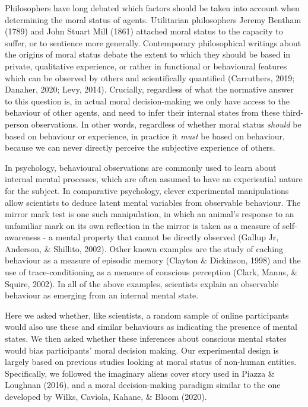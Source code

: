\documentclass[10pt, letterpaper]{article}
\begin{document}
Philosophers have long debated which factors should be taken into
account when determining the moral status of agents. Utilitarian
philosophers Jeremy Bentham (1789) and John Stuart Mill (1861) attached
moral status to the capacity to suffer, or to sentience more generally.
Contemporary philosophical writings about the origins of moral status
debate the extent to which they should be based in private, qualitative
experience, or rather in functional or behavioural features which can be
observed by others and scientifically quantified (Carruthers, 2019;
Danaher, 2020; Levy, 2014). Crucially, regardless of what the normative
answer to this question is, in actual moral decision-making we only have
access to the behaviour of other agents, and need to infer their
internal states from these third-person observations. In other words,
regardless of whether moral status \emph{should} be based on behaviour
or experience, in practice it \emph{must} be based on behaviour, because
we can never directly perceive the subjective experience of others.

In psychology, behavioural observations are commonly used to learn about
internal mental processes, which are often assumed to have an
experiential nature for the subject. In comparative psychology, clever
experimental manipulations allow scientists to deduce latent mental
variables from observable behaviour. The mirror mark test is one such
manipulation, in which an animal's response to an unfamiliar mark on its
own reflection in the mirror is taken as a measure of self-awareness - a
mental property that cannot be directly observed (Gallup Jr, Anderson,
\& Shillito, 2002). Other known examples are the study of caching
behaviour as a measure of episodic memory (Clayton \& Dickinson, 1998)
and the use of trace-conditioning as a measure of conscious perception
(Clark, Manns, \& Squire, 2002). In all of the above examples,
scientists explain an observable behaviour as emerging from an internal
mental state.

Here we asked whether, like scientists, a random sample of online
participants would also use these and similar behaviours as indicating
the presence of mental states. We then asked whether these inferences
about conscious mental states would bias participants' moral decision
making. Our experimental design is largely based on previous studies
looking at moral status of non-human entities. Specifically, we followed
the imaginary aliens cover story used in Piazza \& Loughnan (2016), and
a moral decision-making paradigm similar to the one developed by Wilks,
Caviola, Kahane, \& Bloom (2020).
\end{document}
